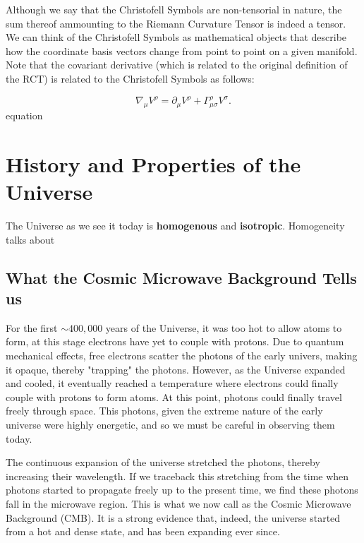 \documentclass[a4paper,11pt]{article}
\begin{document}
Although we say that the Christofell Symbols are non-tensorial in nature, the 
sum thereof ammounting to the Riemann Curvature Tensor is indeed a tensor. 
We can think of the Christofell Symbols as mathematical objects that describe how the 
coordinate basis vectors change from point to point on a given manifold. Note that
the covariant derivative (which is related to the original definition of the RCT) is related
to the Christofell Symbols as follows:

\begin{equation}
    \nabla_\mu V^\rho = \partial_\mu V^\rho + \Gamma^\rho_{\mu\sigma} V^\sigma.
    \label{covariant-derivative-christofell}
\end{equation}
equation


\section{History and Properties of the Universe}
The Universe as we see it today is \textbf{homogenous} and \textbf{isotropic}. Homogeneity talks about

\subsection{What the Cosmic Microwave Background Tells us}
For the first $\sim400,000$ years of the Universe, it was too hot to allow atoms to form, at
this stage electrons have yet to couple with protons. Due to quantum mechanical effects, free electrons scatter
the photons of the early univers, making it opaque, thereby "trapping" the photons. 
However, as the Universe expanded and cooled, it eventually reached a temperature
where electrons could finally couple with protons to form atoms. At this point,
photons could finally travel freely through space. This photons, given the extreme nature of the early universe
were highly energetic, and so we must be careful in observing them today.

The continuous expansion of the universe
stretched the photons, thereby increasing their wavelength. If we traceback this stretching from the time when 
photons started to propagate freely up to the present time, we find these photons fall in the microwave region. 
This is what we now call as the Cosmic Microwave Background (CMB). It is a strong evidence that, indeed, 
the universe started from a hot and dense state, and has been expanding ever since. 

\cite{alineaTransformationPrimordialCosmological2021, minamitsujiDisformalTransformationCosmological2014, dodelsonModernCosmology2021, 211111634InvertibleDisformal, alineaInflationaryUniversePower2017}
\end{document}
